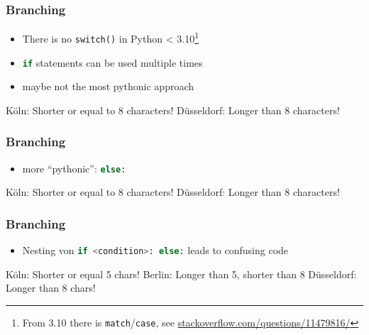 \documentclass[english]{beamer}
\newcommand{\ta}[1]{\textattachfile[color=1 0 0]{#1}{Code}}
\begin{document}
\begin{frame}[containsverbatim]
\frametitle{Branching}

\begin{itemize}
\item There is no \texttt{switch()} in Python < 3.10\footnote{From 3.10 there is \texttt{match}/\texttt{case}, see \url{stackoverflow.com/questions/11479816/}}
\item \lstinline[language={Python}]{if} statements can be used multiple times
\item maybe not the most pythonic approach
\end{itemize}



\begin{ausgabe}
Köln: Shorter or equal to 8 characters!
Düsseldorf: Longer than 8 characters!
\end{ausgabe}
\end{frame}


\begin{frame}[containsverbatim]
\frametitle{Branching}

\begin{itemize}
\item more \enquote{pythonic}:  \lstinline[language={Python}]{else:}
\end{itemize}



\begin{ausgabe}
Köln: Shorter or equal to 8 characters!
Düsseldorf: Longer than 8 characters!
\end{ausgabe}

\end{frame}

\begin{frame}[containsverbatim]
\frametitle{Branching}

\begin{itemize}
\item Nesting von \lstinline[language={Python}]{if <condition>: else:} leads to confusing code
\end{itemize}



\begin{ausgabe}
Köln: Shorter or equal 5 chars!
Berlin: Longer than 5, shorter than 8
Düsseldorf: Longer than 8 chars!
\end{ausgabe}

\end{frame}
\end{document}
